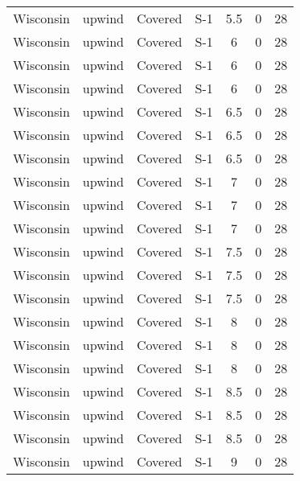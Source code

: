 \documentclass{article}
\begin{document}
\begin{longtable}[c]{ccccccc}
Wisconsin & upwind    & Covered     & S-1             & 5.5          & 0           & 28  \\
Wisconsin & upwind    & Covered     & S-1             & 6            & 0           & 28  \\
Wisconsin & upwind    & Covered     & S-1             & 6            & 0           & 28  \\
Wisconsin & upwind    & Covered     & S-1             & 6            & 0           & 28  \\
Wisconsin & upwind    & Covered     & S-1             & 6.5          & 0           & 28  \\
Wisconsin & upwind    & Covered     & S-1             & 6.5          & 0           & 28  \\
Wisconsin & upwind    & Covered     & S-1             & 6.5          & 0           & 28  \\
Wisconsin & upwind    & Covered     & S-1             & 7            & 0           & 28  \\
Wisconsin & upwind    & Covered     & S-1             & 7            & 0           & 28  \\
Wisconsin & upwind    & Covered     & S-1             & 7            & 0           & 28  \\
Wisconsin & upwind    & Covered     & S-1             & 7.5          & 0           & 28  \\
Wisconsin & upwind    & Covered     & S-1             & 7.5          & 0           & 28  \\
Wisconsin & upwind    & Covered     & S-1             & 7.5          & 0           & 28  \\
Wisconsin & upwind    & Covered     & S-1             & 8            & 0           & 28  \\
Wisconsin & upwind    & Covered     & S-1             & 8            & 0           & 28  \\
Wisconsin & upwind    & Covered     & S-1             & 8            & 0           & 28  \\
Wisconsin & upwind    & Covered     & S-1             & 8.5          & 0           & 28  \\
Wisconsin & upwind    & Covered     & S-1             & 8.5          & 0           & 28  \\
Wisconsin & upwind    & Covered     & S-1             & 8.5          & 0           & 28  \\
Wisconsin & upwind    & Covered     & S-1             & 9            & 0           & 28  \\

\end{longtable}
\end{document}
